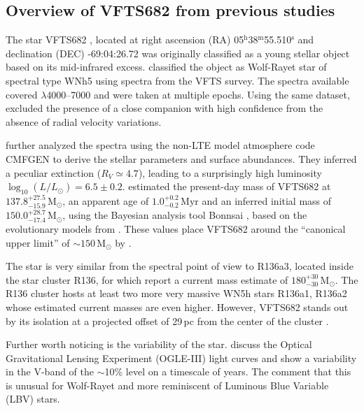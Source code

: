 \documentclass[apjl,twocolumn]{emulateapj}
\newcommand{\todo}[1]{{\large $\blacksquare$~\textbf{\color{red}[#1]}}~$\blacksquare$}
\newcommand{\Msun}{{\,\mathrm{M}_\odot}}
\DeclareRobustCommand{\Secref}[1]{Sec.~\ref{#1}}
\begin{document}

\subsection{ Overview of VFTS682 from previous studies \label{data:vfts683}}

The star VFTS682  \citep{evans:11}, located at right ascension (RA)
05$^\mathrm{h}$38$^\mathrm{m}$55.510$^\mathrm{s}$  and declination
(DEC) -69:04:26.72 \citep[][]{evans:11}
was originally classified as a young stellar object \citep{gruendl:09}
based on its mid-infrared excess.  \citet{evans:11} classified the
object as Wolf-Rayet star of spectral type WNh5 using spectra from the
VFTS survey.  The spectra available covered $\lambda$4000--7000 and
were taken at multiple epochs. Using the same dataset,
\citet{bestenlehner:11} excluded the presence of a close companion
with high confidence from the absence of radial velocity variations.

\citet{bestenlehner:11} further analyzed the spectra using the non-LTE
model atmosphere code CMFGEN \citep{hillier:98} to derive the stellar
parameters and surface abundances. They inferred a peculiar extinction
($R_V\simeq4.7$), leading to a surprisingly high luminosity
$\log_{10}(L/L_\odot) =  6.5\pm0.2$. \citep{schneider:18} estimated
the present-day mass of VFTS682 at  $137.8^{+27.5}_ {-15.9}\Msun$, an
apparent age of $1.0^{+0.2}_{-0.2}$\,Myr and an inferred initial mass
of $150.0^{+28.7}_{-17.4}\Msun$, using the Bayesian analysis tool Bonnsai
\citep{schneider:17}, based on the evolutionary models from
\citet{brott:11, kohler:15}. These values place VFTS682 around the
``canonical upper limit'' of $\sim$$150\Msun$ by \citet{figer:05}.

The star is very similar from the spectral point of view to R136a3, located inside the star cluster
R136, \citep{crowther:10}  for which \citet{crowther:16} report a
current mass estimate of $180^{+30}_{-30}\Msun$. The R136 cluster hosts
at least two more very massive WN5h stars R136a1, R136a2 whose
estimated current masses are even higher. However, VFTS682 stands
out by its isolation at a projected offset of 29\,pc from the center
of the cluster \citep{bestenlehner:11}.  

Further worth noticing is the variability of the star.
\citep{bestenlehner:11} discuss the Optical Gravitational Lensing
Experiment (OGLE-III) light curves \citep{udalski:08} and show a
variability in the V-band of the $\sim$10\% level on a timescale of years.
The comment that this is unusual for Wolf-Rayet and more reminiscent
of Luminous Blue Variable (LBV) stars. 
\end{document}
